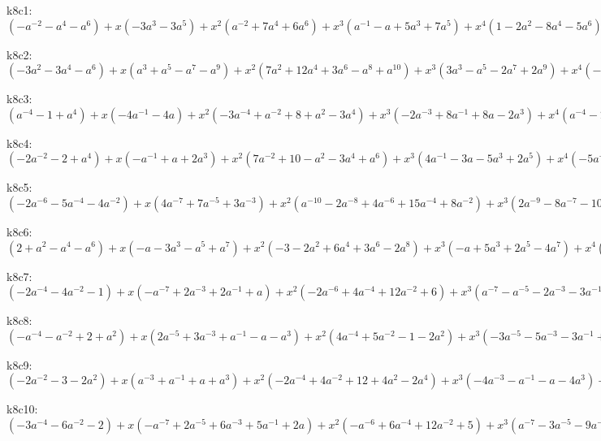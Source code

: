 k8c1: $ (-a^{-2}-a^{4}-a^{6}) +x(-3a^{3}-3a^{5}) +x^{2}(a^{-2}+7a^{4}+6a^{6}) +x^{3}(a^{-1}-a+5a^{3}+7a^{5}) +x^{4}(1-2a^{2}-8a^{4}-5a^{6}) +x^{5}(a-4a^{3}-5a^{5}) +x^{6}(a^{2}+2a^{4}+a^{6}) +x^{7}(a^{3}+a^{5}) $

k8c2: $ (-3a^{2}-3a^{4}-a^{6}) +x(a^{3}+a^{5}-a^{7}-a^{9}) +x^{2}(7a^{2}+12a^{4}+3a^{6}-a^{8}+a^{10}) +x^{3}(3a^{3}-a^{5}-2a^{7}+2a^{9}) +x^{4}(-5a^{2}-12a^{4}-5a^{6}+2a^{8}) +x^{5}(-4a^{3}-2a^{5}+2a^{7}) +x^{6}(a^{2}+3a^{4}+2a^{6}) +x^{7}(a^{3}+a^{5}) $

k8c3: $ (a^{-4}-1+a^{4}) +x(-4a^{-1}-4a) +x^{2}(-3a^{-4}+a^{-2}+8+a^{2}-3a^{4}) +x^{3}(-2a^{-3}+8a^{-1}+8a-2a^{3}) +x^{4}(a^{-4}-2a^{-2}-6-2a^{2}+a^{4}) +x^{5}(a^{-3}-4a^{-1}-4a+a^{3}) +x^{6}(a^{-2}+2+a^{2}) +x^{7}(a^{-1}+a) $

k8c4: $ (-2a^{-2}-2+a^{4}) +x(-a^{-1}+a+2a^{3}) +x^{2}(7a^{-2}+10-a^{2}-3a^{4}+a^{6}) +x^{3}(4a^{-1}-3a-5a^{3}+2a^{5}) +x^{4}(-5a^{-2}-11-3a^{2}+3a^{4}) +x^{5}(-4a^{-1}-a+3a^{3}) +x^{6}(a^{-2}+3+2a^{2}) +x^{7}(a^{-1}+a) $

k8c5: $ (-2a^{-6}-5a^{-4}-4a^{-2}) +x(4a^{-7}+7a^{-5}+3a^{-3}) +x^{2}(a^{-10}-2a^{-8}+4a^{-6}+15a^{-4}+8a^{-2}) +x^{3}(2a^{-9}-8a^{-7}-10a^{-5}) +x^{4}(3a^{-8}-7a^{-6}-15a^{-4}-5a^{-2}) +x^{5}(4a^{-7}+a^{-5}-3a^{-3}) +x^{6}(3a^{-6}+4a^{-4}+a^{-2}) +x^{7}(a^{-5}+a^{-3}) $

k8c6: $ (2+a^{2}-a^{4}-a^{6}) +x(-a-3a^{3}-a^{5}+a^{7}) +x^{2}(-3-2a^{2}+6a^{4}+3a^{6}-2a^{8}) +x^{3}(-a+5a^{3}+2a^{5}-4a^{7}) +x^{4}(1-6a^{4}-4a^{6}+a^{8}) +x^{5}(a-2a^{3}-a^{5}+2a^{7}) +x^{6}(a^{2}+3a^{4}+2a^{6}) +x^{7}(a^{3}+a^{5}) $

k8c7: $ (-2a^{-4}-4a^{-2}-1) +x(-a^{-7}+2a^{-3}+2a^{-1}+a) +x^{2}(-2a^{-6}+4a^{-4}+12a^{-2}+6) +x^{3}(a^{-7}-a^{-5}-2a^{-3}-3a^{-1}-3a) +x^{4}(2a^{-6}-3a^{-4}-12a^{-2}-7) +x^{5}(2a^{-5}-a^{-1}+a) +x^{6}(2a^{-4}+4a^{-2}+2) +x^{7}(a^{-3}+a^{-1}) $

k8c8: $ (-a^{-4}-a^{-2}+2+a^{2}) +x(2a^{-5}+3a^{-3}+a^{-1}-a-a^{3}) +x^{2}(4a^{-4}+5a^{-2}-1-2a^{2}) +x^{3}(-3a^{-5}-5a^{-3}-3a^{-1}+a^{3}) +x^{4}(-6a^{-4}-9a^{-2}-1+2a^{2}) +x^{5}(a^{-5}+a^{-1}+2a) +x^{6}(2a^{-4}+4a^{-2}+2) +x^{7}(a^{-3}+a^{-1}) $

k8c9: $ (-2a^{-2}-3-2a^{2}) +x(a^{-3}+a^{-1}+a+a^{3}) +x^{2}(-2a^{-4}+4a^{-2}+12+4a^{2}-2a^{4}) +x^{3}(-4a^{-3}-a^{-1}-a-4a^{3}) +x^{4}(a^{-4}-4a^{-2}-10-4a^{2}+a^{4}) +x^{5}(2a^{-3}+2a^{3}) +x^{6}(2a^{-2}+4+2a^{2}) +x^{7}(a^{-1}+a) $

k8c10: $ (-3a^{-4}-6a^{-2}-2) +x(-a^{-7}+2a^{-5}+6a^{-3}+5a^{-1}+2a) +x^{2}(-a^{-6}+6a^{-4}+12a^{-2}+5) +x^{3}(a^{-7}-3a^{-5}-9a^{-3}-8a^{-1}-3a) +x^{4}(2a^{-6}-5a^{-4}-13a^{-2}-6) +x^{5}(3a^{-5}+3a^{-3}+a^{-1}+a) +x^{6}(3a^{-4}+5a^{-2}+2) +x^{7}(a^{-3}+a^{-1}) $

